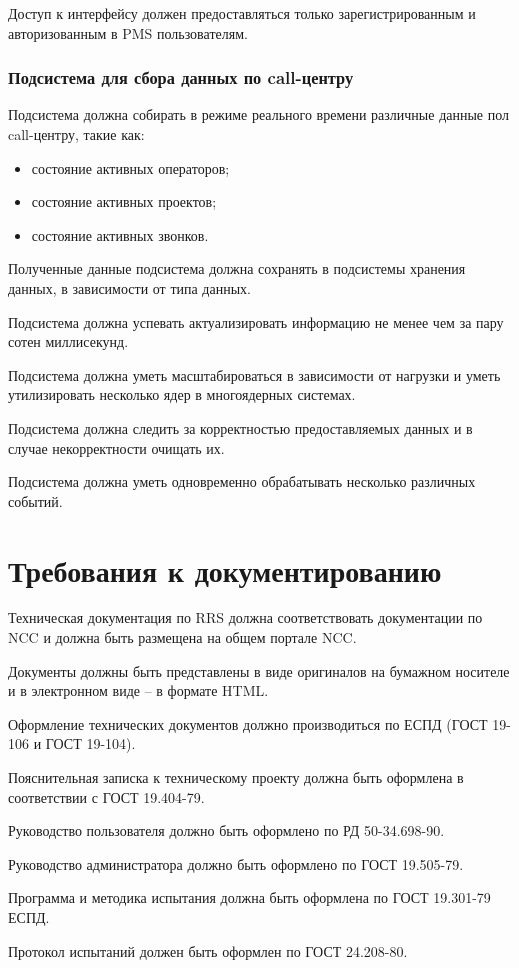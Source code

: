 Доступ к интерфейсу должен предоставляться только зарегистрированным и авторизованным в PMS пользователям.

\subsubsection{Подсистема для сбора данных по call-центру}

Подсистема должна собирать в режиме реального времени различные данные пол call-центру, такие как:
\begin{itemize}
    \item состояние активных операторов;
    \item состояние активных проектов;
    \item состояние активных звонков.
\end{itemize}

Полученные данные подсистема должна сохранять в подсистемы хранения данных, в зависимости от типа данных.

Подсистема должна успевать актуализировать информацию не менее чем за пару сотен миллисекунд.

Подсистема должна уметь масштабироваться в зависимости от нагрузки и уметь утилизировать несколько ядер в многоядерных системах.

Подсистема должна следить за корректностью предоставляемых данных и в случае некорректности очищать их.

Подсистема должна уметь одновременно обрабатывать несколько различных событий.

\section{Требования к документированию}

Техническая документация по RRS должна соответствовать документации по NCC
и должна быть размещена на общем портале NCC\@.

Документы должны быть представлены в виде оригиналов на бумажном носителе и в электронном виде – в формате HTML\@.

Оформление технических документов должно производиться по ЕСПД (ГОСТ 19-106 и ГОСТ 19-104).

Пояснительная записка к техническому проекту должна быть оформлена в соответствии с ГОСТ 19.404-79.

Руководство пользователя должно быть оформлено по РД 50-34.698-90.

Руководство администратора должно быть оформлено по ГОСТ 19.505-79.

Программа и методика испытания должна быть оформлена по ГОСТ 19.301-79 ЕСПД.

Протокол испытаний должен быть оформлен по ГОСТ 24.208-80.